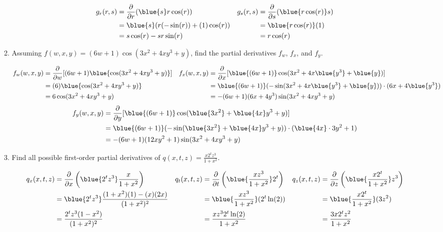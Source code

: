 \begin{enumerate}[leftmargin=0pt]
\begin{enumerate}
    \begin{red}
        \begin{align*}
            g_r(r,s) &= \frac{\partial}{\partial r} (\blue{s} r\cos(r)) &
            g_s(r,s) &= \frac{\partial}{\partial s} (\blue{r \cos(r)} s) \\
            &= \blue{s}(r(-\sin(r)) + (1)\cos(r)) &
            &= \blue{r \cos(r)} (1) \\
            &= s\cos(r) - sr\sin(r) &
            &= r\cos(r)
        \end{align*}
    \end{red}
    \item Assuming $f(w,x,y) = (6w+1)\cos(3x^2+4xy^3+y)$, find the partial derivatives $f_w$, $f_x$, and $f_y$.
    \begin{red}
        \begin{align*}
            f_w(w,x,y) &= \frac{\partial}{\partial w} [(6w+1)\blue{\cos(3x^2+4xy^3+y)}] &
            f_x(w,x,y) &= \frac{\partial}{\partial x} [\blue{(6w+1)} \cos(3x^2+4x\blue{y^3}+\blue{y})] \\
            &= (6)\blue{\cos(3x^2+4xy^3+y)} &
            &= \blue{(6w+1)}(-\sin(3x^2+4x\blue{y^3}+\blue{y}))\cdot(6x+4\blue{y^3}) \\
            &= 6\cos(3x^2+4xy^3+y) &
            &= -(6w+1)(6x+4y^3)\sin(3x^2+4xy^3+y) \\
        \end{align*}
        \begin{align*}
            f_y(w,x,y) &= \frac{\partial}{\partial y} [\blue{(6w+1)}\cos(\blue{3x^2}+\blue{4x}y^3+y)] \\
            &= \blue{(6w+1)}(-\sin(\blue{3x^2}+\blue{4x}y^3+y))\cdot(\blue{4x}\cdot 3y^2 + 1) \\
            &= -(6w+1)(12xy^2+1)\sin(3x^2+4xy^3+y)
        \end{align*}
    \end{red}
    \item Find all possible first-order partial derivatives of $q(x,t,z) =
    \displaystyle \frac{x2^tz^3}{1+x^2}$.
    \begin{red}
        \begin{align*}
            q_x(x,t,z) &= \frac{\partial}{\partial x}\left(\blue{2^tz^3}\frac{x}{1+x^2}\right) &
            q_t(x,t,z) &= \frac{\partial}{\partial t}\left(\blue{\frac{xz^3}{1+x^2}}2^t\right) &
            q_z(x,t,z) &= \frac{\partial}{\partial z}\left(\blue{\frac{x2^t}{1+x^2}}z^3\right) \\
            &= \blue{2^tz^3}\frac{(1+x^2)(1) - (x)(2x)}{(1+x^2)^2} &
            &= \blue{\frac{xz^3}{1+x^2}}(2^t\ln(2)) &
            &= \blue{\frac{x2^t}{1+x^2}}(3z^2) \\
            &= \frac{2^t z^3 (1-x^2)}{(1+x^2)^2} &
            &= \frac{x z^3 2^t \ln(2)}{1+x^2} &
            &= \frac{3x 2^t z^2}{1+x^2}
        \end{align*}
    \end{red}
\end{enumerate}


\end{enumerate}
